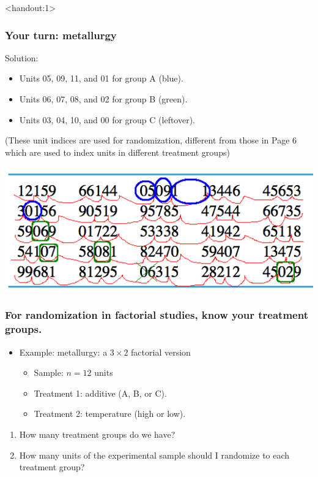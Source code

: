\documentclass[handout]{beamer}
\newcommand{\answers}{1}
\numberwithin{equation}{section}
\begin{document}
\begin{frame}<handout:\answers>
\frametitle{Your turn: metallurgy}

Solution:
\begin{itemize}
\item Units 05, 09, 11, and 01 for group A (blue).
\pause \item Units 06, 07, 08, and 02 for group B (green).
\pause \item Units 03, 04, 10, and 00 for group C (leftover).
\end{itemize}

(These unit indices are used for randomization, different from those in Page 6 which are used to index units in different treatment groups)


\begin{center}
 \includegraphics{../../fig/rdigitsshortranomize1.png}
\end{center}

\end{frame}



\begin{frame}
\frametitle{For randomization in factorial studies, know your treatment groups.}


\begin{itemize}
\item Example: metallurgy: a $3 \times 2$ factorial version
\begin{itemize}
\pause \item Sample: $n = 12$ units
\pause \item Treatment 1: additive (A, B, or C).
\pause \item Treatment 2: temperature (high or low).
\end{itemize} 
\end{itemize}

\begin{enumerate}[1. ]
\pause \item How many treatment groups do we have?
\pause \item How many units of the experimental sample should I randomize to each treatment group?
\end{enumerate}

\end{frame}
\end{document}
